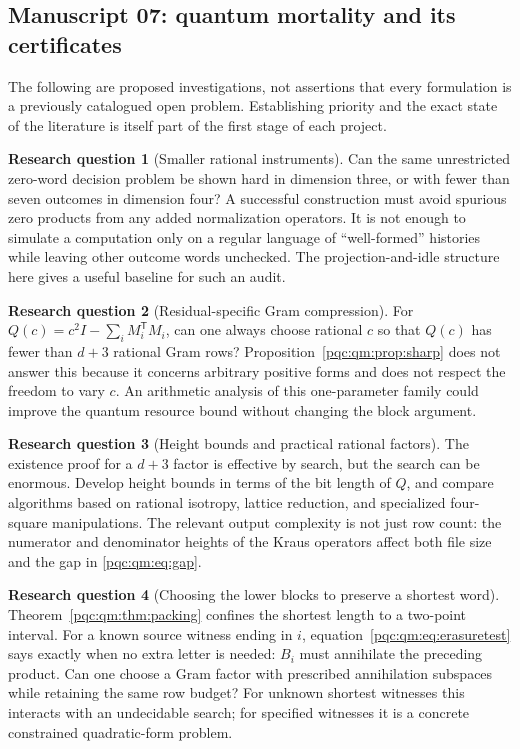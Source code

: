 \documentclass[11pt,letterpaper]{article}
\numberwithin{equation}{section}
\theoremstyle{definition}
\newtheorem{question}{Research question}
\theoremstyle{remark}
\begin{document}
\subsection{Manuscript 07: quantum mortality and its certificates}
\label{pqc:conv:q07}\label{pqc:qm:sec:future}
The following are proposed investigations, not assertions that every formulation is a previously catalogued open problem. Establishing priority and the exact state of the literature is itself part of the first stage of each project.
\begin{question}[Smaller rational instruments]\label{pqc:q:instruments}
Can the same unrestricted zero-word decision problem be shown hard in dimension three, or with fewer than seven outcomes in dimension four? A successful construction must avoid spurious zero products from any added normalization operators. It is not enough to simulate a computation only on a regular language of ``well-formed'' histories while leaving other outcome words unchecked. The projection-and-idle structure here gives a useful baseline for such an audit.
\end{question}

\begin{question}[Residual-specific Gram compression]
For $Q(c)=c^2I-\sum_iM_i^{\mathsf T}M_i$, can one always choose rational $c$ so that $Q(c)$ has fewer than $d+3$ rational Gram rows? Proposition~\ref{pqc:qm:prop:sharp} does not answer this because it concerns arbitrary positive forms and does not respect the freedom to vary $c$. An arithmetic analysis of this one-parameter family could improve the quantum resource bound without changing the block argument.
\end{question}

\begin{question}[Height bounds and practical rational factors]
The existence proof for a $d+3$ factor is effective by search, but the search can be enormous. Develop height bounds in terms of the bit length of $Q$, and compare algorithms based on rational isotropy, lattice reduction, and specialized four-square manipulations. The relevant output complexity is not just row count: the numerator and denominator heights of the Kraus operators affect both file size and the gap in \eqref{pqc:qm:eq:gap}.
\end{question}

\begin{question}[Choosing the lower blocks to preserve a shortest word]
Theorem~\ref{pqc:qm:thm:packing} confines the shortest length to a two-point interval. For a known source witness ending in $i$, equation~\eqref{pqc:qm:eq:erasuretest} says exactly when no extra letter is needed: $B_i$ must annihilate the preceding product. Can one choose a Gram factor with prescribed annihilation subspaces while retaining the same row budget? For unknown shortest witnesses this interacts with an undecidable search; for specified witnesses it is a concrete constrained quadratic-form problem.
\end{question}
\end{document}
